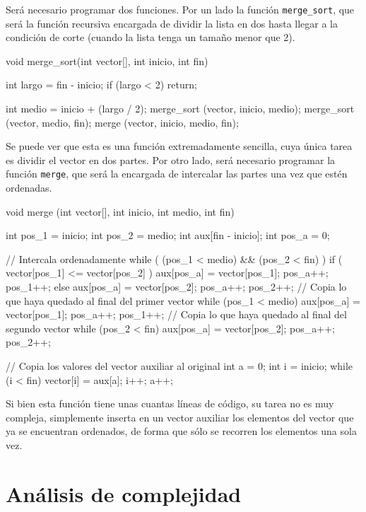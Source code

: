 Será necesario programar dos funciones.  Por un lado la función
\lstinline!merge_sort!, que será la función recursiva encargada de dividir
la lista en dos hasta llegar a la condición de corte (cuando la lista tenga
un tamaño menor que 2).

\begin{codigo-c}
void merge_sort(int vector[], int inicio, int fin)
{
    int largo = fin - inicio;
    if (largo < 2) {
        return;
    }

    int medio = inicio + (largo / 2);
    merge_sort (vector, inicio, medio);
    merge_sort (vector, medio, fin);
    merge (vector, inicio, medio, fin);
}
\end{codigo-c}

Se puede ver que esta es una función extremadamente sencilla, cuya única
tarea es dividir el vector en dos partes. Por otro lado, será necesario
programar la función \lstinline!merge!, que será la encargada de intercalar
las partes una vez que estén ordenadas.

\begin{codigo-c}
void merge (int vector[], int inicio, int medio, int fin)
{
    int pos_1 = inicio;
    int pos_2 = medio;
    int aux[fin - inicio];
    int pos_a = 0;

    // Intercala ordenadamente
    while ( (pos_1 < medio) && (pos_2 < fin) ) {
        if ( vector[pos_1] <= vector[pos_2] ) {
            aux[pos_a] = vector[pos_1];
            pos_a++; pos_1++;
        } else {
            aux[pos_a] = vector[pos_2];
            pos_a++; pos_2++;
        }
    }
    // Copia lo que haya quedado al final del primer vector
    while (pos_1 < medio) {
        aux[pos_a] = vector[pos_1];
        pos_a++; pos_1++;
    }
    // Copia lo que haya quedado al final del segundo vector
    while (pos_2 < fin) {
        aux[pos_a] = vector[pos_2];
        pos_a++; pos_2++;
    }

    // Copia los valores del vector auxiliar al original
    int a = 0;
    int i = inicio;
    while (i < fin) {
        vector[i] = aux[a];
        i++; a++;
    }
}
\end{codigo-c}

Si bien esta función tiene unas cuantas líneas de código, su tarea no es
muy compleja, simplemente inserta en un vector auxiliar los elementos del
vector que ya se encuentran ordenados, de forma que sólo se recorren los
elementos una sola vez.

\section{Análisis de complejidad}

